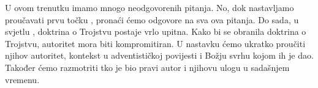 U ovom trenutku imamo mnogo neodgovorenih pitanja. No, dok nastavljamo proučavati prvu točku , pronaći ćemo odgovore na sva ova pitanja. Do sada, u svjetlu , doktrina o Trojstvu postaje vrlo upitna. Kako bi se obranila doktrina o Trojstvu, autoritet  mora biti kompromitiran. U nastavku ćemo ukratko proučiti njihov autoritet, kontekst u adventističkoj povijesti i Božju svrhu kojom ih je dao. Također ćemo razmotriti tko je bio pravi autor  i njihovu ulogu u sadašnjem vremenu.

